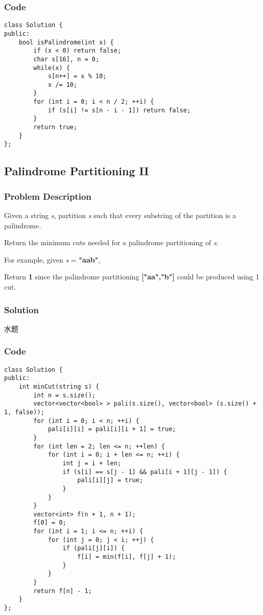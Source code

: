\documentclass[courier]{article}
\begin{document}
\begin{CJK*}{UTF8}{gkai}
\subsubsection*{Code}
\begin{lstlisting}
class Solution {
public:
    bool isPalindrome(int x) {
        if (x < 0) return false;
        char s[16], n = 0;
        while(x) {
            s[n++] = x % 10;
            x /= 10;
        }
        for (int i = 0; i < n / 2; ++i) {
            if (s[i] != s[n - i - 1]) return false;
        }
        return true;
    }
}; 
\end{lstlisting}


\subsection{ Palindrome Partitioning II }

\subsubsection*{Problem Description}
Given a string \emph{s}, partition \emph{s} such that every substring of the partition is a palindrome.

Return the minimum cuts needed for a palindrome partitioning of \emph{s}.

For example, given \emph{s} = \textbf{"aab"},


Return \textbf{1} since the palindrome partitioning \textbf{["aa","b"]} could be produced using 1 cut.



\subsubsection*{Solution}
水题

\subsubsection*{Code}
\begin{lstlisting}
class Solution {
public:
    int minCut(string s) {
        int n = s.size();
        vector<vector<bool> > pali(s.size(), vector<bool> (s.size() + 1, false));
        for (int i = 0; i < n; ++i) {
            pali[i][i] = pali[i][i + 1] = true;
        }
        for (int len = 2; len <= n; ++len) {
            for (int i = 0; i + len <= n; ++i) {
                int j = i + len;
                if (s[i] == s[j - 1] && pali[i + 1][j - 1]) {
                    pali[i][j] = true;
                }
            }
        }
        vector<int> f(n + 1, n + 1);
        f[0] = 0;
        for (int i = 1; i <= n; ++i) {
            for (int j = 0; j < i; ++j) {
                if (pali[j][i]) {
                    f[i] = min(f[i], f[j] + 1);
                }
            }
        }
        return f[n] - 1;
    }
}; 
\end{lstlisting}



\end{CJK*}
\end{document}
